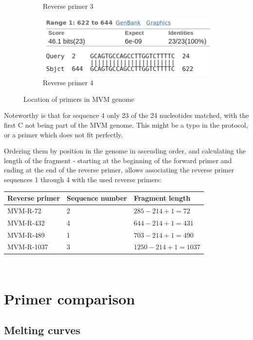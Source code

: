 \documentclass[a4paper,english]{scrreprt}
\begin{document}
\begin{figure}
\begin{subfigure}{.475\textwidth}
		\caption{Reverse primer 3}
		\label{fig:primer_3}
	\end{subfigure}%
	\begin{subfigure}{.475\textwidth}
		\centering
		\includegraphics[width=\linewidth]{img/primer_4.png}
		\caption{Reverse primer 4}
		\label{fig:primer_4}
	\end{subfigure}
	\caption{Location of primers in MVM genome}
	\label{fig:primer_locations}
\end{figure}

Noteworthy is that for sequence 4 only 23 of the 24 nucleotides matched, with
the first C not being part of the MVM genome. This might be a typo in the
protocol, or a primer which does not fit perfectly.

Ordering them by position in the genome in ascending order, and calculating the
length of the fragment - starting at the beginning of the forward primer and
ending at the end of the reverse primer, allows associating the reverse primer
sequences 1 through 4 with the used reverse primers:
\\

\begin{tabu}{lll}
	\toprule
	Reverse primer & Sequence number & Fragment length \\
	\midrule
	MVM-R-72 & 2 & $285 - 214 + 1 = 72$ \\
	MVM-R-432 & 4 & $644 - 214 + 1 = 431$ \\
	MVM-R-489 & 1 & $703 - 214 + 1 = 490$ \\
	MVM-R-1037 & 3 & $1250 - 214 + 1 = 1037$ \\
	\bottomrule
\end{tabu}
\\

\section{Primer comparison}

\subsection{Melting curves}
\end{document}
